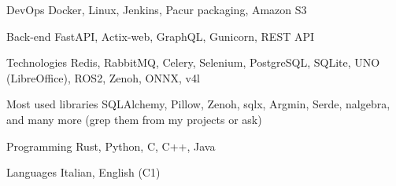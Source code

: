 

\begin{cvskills}

  \cvskill
    {DevOps} %
    {Docker, Linux, Jenkins, Pacur packaging, Amazon S3} %

  \cvskill
    {Back-end} %
    {FastAPI, Actix-web, GraphQL, Gunicorn, REST API} %

\cvskill
	{Technologies} %
	{Redis, RabbitMQ, Celery, Selenium, PostgreSQL, SQLite, UNO (LibreOffice), ROS2, Zenoh, ONNX, v4l} %


  \cvskill
    {Most used libraries} %
    {SQLAlchemy, Pillow, Zenoh, sqlx, Argmin, Serde, nalgebra, and many more (grep them from my projects or ask)} %

  \cvskill
    {Programming} %
    {Rust, Python, C, C++, Java} %

  \cvskill
    {Languages} %
    {Italian, English (C1)} %

\end{cvskills}
